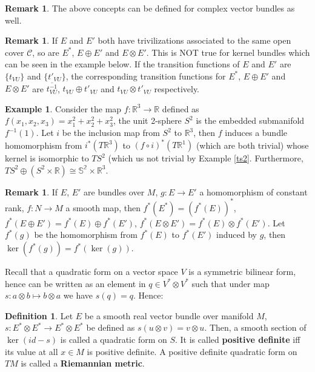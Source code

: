 \documentclass{article}
\theoremstyle{definition}
\newtheorem{dfn}[thm]{Definition}
\newtheorem{rmk}[thm]{Remark}
\newtheorem{exm}[thm]{Example}
\begin{document}
\begin{rmk}
    The above concepts can be defined for complex vector bundles as well.
\end{rmk}

\begin{rmk}\label{consttran}
    If $E$ and $E'$ both have trivilizations associated to the same open cover $\mathcal{C}$, so are $E^*$, $E\oplus E'$ and $E\otimes E'$. This is NOT true for kernel bundles which can be seen in the example below. If the transition functions of $E$ and $E'$ are $\{t_{VU}\}$ and $\{t'_{VU}\}$, the corresponding transition functions for $E^*$, $E\oplus E'$ and $E\otimes E'$ are $\overline{t_{VU}^{-1}}$, $t_{VU}\oplus t'_{VU}$ and $t_{VU}\otimes t'_{VU}$ respectively.
\end{rmk}

\begin{exm}
    Consider the map $f: \mathbb{R}^3\rightarrow\mathbb{R}$ defined as $f(x_1, x_2, x_3)=x_1^2+x_2^2+x_3^2$, the unit 2-sphere $S^2$ is the embedded submanifold $f^{-1}(1)$. Let $i$ be the inclusion map from $S^2$ to $\mathbb{R}^3$, then $f$ induces a bundle homomorphism from $i^*(T\mathbb{R}^3)$ to $(f\circ i)^*(T\mathbb{R}^1)$ (which are both trivial) whose kernel is isomorphic to $TS^2$ (which us not trivial by Example \ref{ts2}. Furthermore, $TS^2\oplus (S^2\times \mathbb{R})\cong \mathbb{S^2}\times\mathbb{R}^3$.
\end{exm}

\begin{rmk}
    If $E$, $E'$ are bundles over $M$, $g: E\rightarrow E'$ a homomorphism of constant rank, $f: N\rightarrow M$ a smooth map, then $f^*(E^*)=(f^*(E))^*$, $f^*(E\oplus E')=f^*(E)\oplus f^*(E')$, $f^*(E\otimes E')=f^*(E)\otimes f^*(E')$. Let $f^*(g)$ be the homomorphism from $f^*(E)$ to $f^*(E')$ induced by $g$, then $\ker(f^*(g))=f^*(\ker(g))$.
\end{rmk}

Recall that a quadratic form on a vector space $V$ is a symmetric bilinear form, hence can be written as an element in $q\in V^*\otimes V^*$ such that under map $s: a\otimes b\mapsto b\otimes a$ we have $s(q)=q$. Hence:

\begin{dfn}
    Let $E$ be a smooth real vector bundle over manifold $M$, $s: E^*\otimes E^*\rightarrow E^*\otimes E^*$ be defined as $s(u\otimes v)=v\otimes u$. Then, a smooth section of $\ker(id-s)$ is called a quadratic form on $S$. It is called {\bf positive definite} iff its value at all $x\in M$ is positive definite. A positive definite quadratic form on $TM$ is called a {\bf Riemannian metric}.
\end{dfn}
\end{document}
